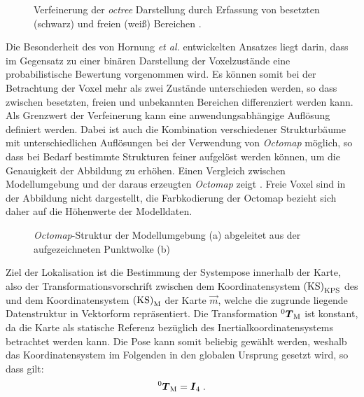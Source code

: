 \begin{figure}[!ht]
	\begin{center}
	\hspace{5mm}
	\caption{Verfeinerung der \textit{octree} Darstellung durch Erfassung von besetzten (schwarz) und freien (weiß) Bereichen \cite{Hornung2013}. }
	\label{fig.octree}
	\end{center}
\end{figure}

Die Besonderheit des von Hornung \textit{et al.} entwickelten Ansatzes liegt darin, dass im Gegensatz zu einer binären Darstellung der Voxelzustände eine probabilistische Bewertung vorgenommen wird. Es können somit bei der Betrachtung der Voxel mehr als zwei Zustände unterschieden werden, so dass zwischen besetzten, freien und unbekannten Bereichen differenziert werden kann. Als Grenzwert der Verfeinerung kann eine anwendungsabhängige Auflösung definiert werden. Dabei ist auch die Kombination verschiedener Strukturbäume mit unterschiedlichen Auflösungen bei der Verwendung von \textit{Octomap} möglich, so dass bei Bedarf bestimmte Strukturen feiner aufgelöst werden können, um die Genauigkeit der Abbildung zu erhöhen. Einen Vergleich zwischen Modellumgebung und der daraus erzeugten \textit{Octomap} zeigt . Freie Voxel sind in der Abbildung nicht dargestellt, die Farbkodierung der Octomap bezieht sich daher auf die Höhenwerte der Modelldaten.

\begin{figure}[!ht]
	\begin{center}
	\hspace{5mm}
	\caption{\textit{Octomap}-Struktur der Modellumgebung (a) abgeleitet aus der aufgezeichneten Punktwolke (b)}
	\label{fig.octomap}
	\end{center}
\end{figure}%

\clearpage{}

Ziel der Lokalisation ist die Bestimmung der Systempose innerhalb der Karte, also der Transformationsvorschrift zwischen dem Koordinatensystem ${\mathrm{(KS)}}_{\mathrm{KPS}}$ des  und dem Koordinatensystem ${\mathrm{(KS)}}_{\mathrm{M}}$ der Karte $\vec{m}$, welche die zugrunde liegende Datenstruktur in Vektorform repräsentiert. Die Transformation ${^{\mathrm{0}}\mbox{\boldmath{$T$}}_{\mathrm{M}}}$ ist konstant, da die Karte als statische Referenz bezüglich des Inertialkoordinatensystems betrachtet werden kann. Die Pose kann somit beliebig gewählt werden, weshalb das Koordinatensystem im Folgenden in den globalen Ursprung gesetzt wird, so dass gilt:
%
\begin{equation}
{^{\mathrm{0}}\mbox{\boldmath{$T$}}_{\mathrm{M}}} = \mbox{\boldmath{$I$}}_{\mathrm{4}} \; \text{.}
\end{equation}

